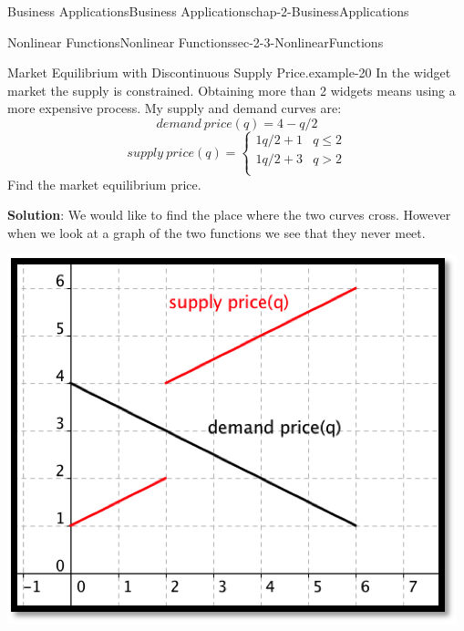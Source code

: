 \documentclass[oneside,10pt,]{book}
\newcommand{\terminology}[1]{\textbf{#1}}
\numberwithin{equation}{section}
\begin{document}
\begin{chapterptx}{Business Applications}{}{Business Applications}{}{}{chap-2-BusinessApplications}
\begin{sectionptx}{Nonlinear Functions}{}{Nonlinear Functions}{}{}{sec-2-3-NonlinearFunctions}
\begin{example}{Market Equilibrium with Discontinuous Supply Price.}{example-20}%
\hypertarget{p-795}{}%
In the widget market the supply is constrained.  Obtaining more than 2 widgets means using a more expensive process.  My supply and demand curves are:%
%
\begin{equation*}
demand\ price(q)=4-q/2
\end{equation*}
%
\begin{equation*}
supply\ price(q)=\begin{cases}
1q/2+1&q\le 2\\
1q/2+3&q>2\\
\end{cases}
\end{equation*}
\hypertarget{p-796}{}%
Find the market equilibrium price.%
\par
\hypertarget{p-797}{}%
\terminology{Solution}:  We would like to find the place where the two curves cross.  However when we look at a graph of the two functions we see that they never meet.%
\begin{sidebyside}{1}{0.2}{0.2}{0}%
\begin{sbspanel}{0.6}%
\includegraphics[width=1\linewidth]{images/sec2-3-9.png}
\end{sbspanel}%
\end{sidebyside}%
\par
\hypertarget{p-798}{}%

\end{example}
\end{sectionptx}
\end{chapterptx}
\end{document}

